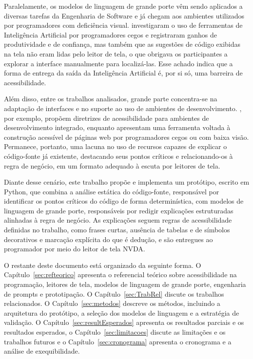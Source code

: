\documentclass[
    12pt,                   %
    openright,              %
    oneside,                %
    a4paper,                %
    sumario=tradicional,    %
    english,                %
    brazil,                 %
    ]{abntex2}
\begin{document}
Paralelamente, os modelos de linguagem de grande porte vêm sendo aplicados a diversas tarefas da Engenharia de Software \cite{hou2024llmse} e já chegam aos ambientes utilizados por programadores com deficiência visual. \textcite{latinoware34224} investigaram o uso de ferramentas de Inteligência Artificial por programadores cegos e registraram ganhos de produtividade e de confiança, mas também que as sugestões de código exibidas na tela não eram lidas pelo leitor de tela, o que obrigava os participantes a explorar a interface manualmente para localizá-las. Esse achado indica que a forma de entrega da saída da Inteligência Artificial é, por si só, uma barreira de acessibilidade.

Além disso, entre os trabalhos analisados, grande parte concentra-se na adaptação de interfaces e no suporte ao uso de ambientes de desenvolvimento. \textcite{latinoware37693}, por exemplo, propõem diretrizes de acessibilidade para ambientes de desenvolvimento integrado, enquanto \textcite{latinoware40920} apresentam uma ferramenta voltada à construção acessível de páginas web por programadores cegos ou com baixa visão. Permanece, portanto, uma lacuna no uso de recursos capazes de explicar o código-fonte já existente, destacando seus pontos críticos e relacionando-os à regra de negócio, em um formato adequado à escuta por leitores de tela.

Diante desse cenário, este trabalho propõe e implementa um protótipo, escrito em Python, que combina a análise estática do código-fonte, responsável por identificar os pontos críticos do código de forma determinística, com modelos de linguagem de grande porte, responsáveis por redigir explicações estruturadas alinhadas à regra de negócio. As explicações seguem regras de acessibilidade definidas no trabalho, como frases curtas, ausência de tabelas e de símbolos decorativos e marcação explícita do que é dedução, e são entregues ao programador por meio do leitor de tela NVDA.

O restante deste documento está organizado da seguinte forma. O Capítulo~\ref{sec:refteorico} apresenta o referencial teórico sobre acessibilidade na programação, leitores de tela, modelos de linguagem de grande porte, engenharia de prompts e prototipação. O Capítulo~\ref{sec:TrabRel} discute os trabalhos relacionados. O Capítulo~\ref{sec:metodos} descreve os métodos, incluindo a arquitetura do protótipo, a seleção dos modelos de linguagem e a estratégia de validação. O Capítulo~\ref{sec:resultEsperados} apresenta os resultados parciais e os resultados esperados, o Capítulo~\ref{sec:limitacoes} discute as limitações e os trabalhos futuros e o Capítulo~\ref{sec:cronograma} apresenta o cronograma e a análise de exequibilidade.
\end{document}
